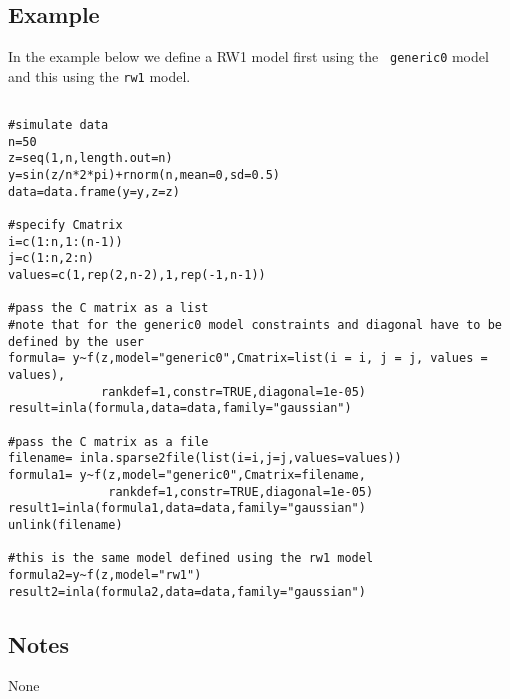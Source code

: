 \documentclass[a4paper,11pt]{article}
\begin{document}
\subsection*{Example}
In the example below we define a RW1 model first using the {\tt
    generic0} model and this using the {\tt rw1} model.
\begin{verbatim}

#simulate data
n=50
z=seq(1,n,length.out=n)
y=sin(z/n*2*pi)+rnorm(n,mean=0,sd=0.5)
data=data.frame(y=y,z=z)

#specify Cmatrix
i=c(1:n,1:(n-1))
j=c(1:n,2:n)
values=c(1,rep(2,n-2),1,rep(-1,n-1))

#pass the C matrix as a list
#note that for the generic0 model constraints and diagonal have to be defined by the user
formula= y~f(z,model="generic0",Cmatrix=list(i = i, j = j, values = values),
             rankdef=1,constr=TRUE,diagonal=1e-05)
result=inla(formula,data=data,family="gaussian")

#pass the C matrix as a file
filename= inla.sparse2file(list(i=i,j=j,values=values))
formula1= y~f(z,model="generic0",Cmatrix=filename,
              rankdef=1,constr=TRUE,diagonal=1e-05)
result1=inla(formula1,data=data,family="gaussian")
unlink(filename)

#this is the same model defined using the rw1 model
formula2=y~f(z,model="rw1")
result2=inla(formula2,data=data,family="gaussian")

\end{verbatim}

\subsection*{Notes}
None
\end{document}
